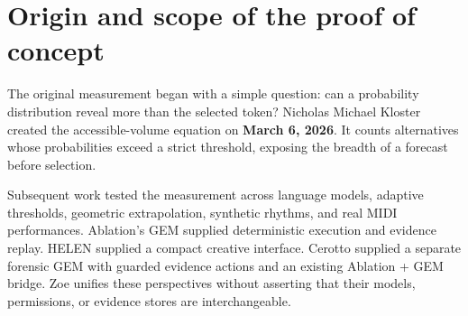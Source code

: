 \documentclass[11pt,a4paper]{article}
\begin{document}
\begin{abstract}
Zoe is a native graphical environment for exploring how forecasts, measurements, beliefs, and actions differ. It unifies HELEN's lightweight geometry and stored predictions, Ablation's Spatial IR and VDI evidence environment, Cerotto's forensic workbench, and BRAIN's deterministic observation and recommendation layer. Its Bayesian field notebook adds questions, competing claims, explicit likelihoods, dependent-evidence barriers, deterministic and stochastic chambers, and append-only memory. This paper documents the complete proof of concept: the accessible-volume equation and its development, temporal and geometric formulations, native GEM versions, Bayesian memory, native interfaces, and independent verification. The work separates measured evidence from interpretation and proposals. Reversed rhythms are learnable under a matched backward model; HOP's geometric predictor is rejected; operational metacognition measures breadth rather than correctness. Twenty-five Zoe tests, 20 broader GEM tests, and 17 conformance checks pass, alongside original model and BioBERT verification, packaging checks, native GUI tests, and a working interactive concept map. Zoe is not a conscious entity, a universal predictor, a diagnostic system, or an autonomous controller. It is a reproducible environment for inspecting alternatives, testing beliefs, preserving evidence, and choosing the next investigation under human direction.
\end{abstract}

\section{Origin and scope of the proof of concept}
The original measurement began with a simple question: can a probability distribution reveal more than the selected token? Nicholas Michael Kloster created the accessible-volume equation on \textbf{March 6, 2026}. It counts alternatives whose probabilities exceed a strict threshold, exposing the breadth of a forecast before selection.

Subsequent work tested the measurement across language models, adaptive thresholds, geometric extrapolation, synthetic rhythms, and real MIDI performances. Ablation's GEM supplied deterministic execution and evidence replay. HELEN supplied a compact creative interface. Cerotto supplied a separate forensic GEM with guarded evidence actions and an existing Ablation + GEM bridge. Zoe unifies these perspectives without asserting that their models, permissions, or evidence stores are interchangeable.
\end{document}
